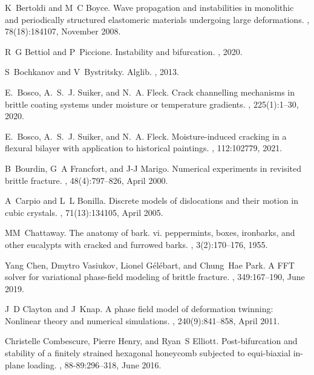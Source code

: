 \documentclass[10pt]{article}
\begin{document}
\begin{thebibliography}{10}
K~Bertoldi and M~C Boyce.
\newblock Wave propagation and instabilities in monolithic and periodically structured elastomeric materials undergoing large deformations.
, 78(18):184107, November 2008.

R~G Bettiol and P~Piccione.
\newblock Instability and bifurcation.
, 2020.

S~Bochkanov and V~Bystritsky.
\newblock Alglib.
, 2013.

E.~Bosco, A.~S.~J. Suiker, and N.~A. Fleck.
\newblock Crack channelling mechanisms in brittle coating systems under moisture or temperature gradients.
, 225(1):1--30, 2020.

E.~Bosco, A.~S.~J. Suiker, and N.~A. Fleck.
\newblock Moisture-induced cracking in a flexural bilayer with application to historical paintings.
, 112:102779, 2021.

B~Bourdin, G~A Francfort, and J-J Marigo.
\newblock Numerical experiments in revisited brittle fracture.
, 48(4):797--826, April 2000.

A~Carpio and L~L Bonilla.
\newblock Discrete models of dislocations and their motion in cubic crystals.
, 71(13):134105, April 2005.

MM~Chattaway.
\newblock The anatomy of bark. vi. peppermints, boxes, ironbarks, and other eucalypts with cracked and furrowed barks.
, 3(2):170--176, 1955.

Yang Chen, Dmytro Vasiukov, Lionel G{\'e}l{\'e}bart, and Chung~Hae Park.
\newblock A {FFT} solver for variational phase-field modeling of brittle fracture.
, 349:167--190, June 2019.

J~D Clayton and J~Knap.
\newblock A phase field model of deformation twinning: Nonlinear theory and numerical simulations.
, 240(9):841--858, April 2011.

Christelle Combescure, Pierre Henry, and Ryan~S Elliott.
\newblock Post-bifurcation and stability of a finitely strained hexagonal honeycomb subjected to equi-biaxial in-plane loading.
, 88-89:296--318, June 2016.


\end{thebibliography}
\end{document}
